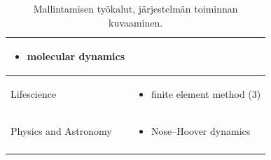\documentclass[utf8]{gradu3}
\begin{document}
\begin{longtable}[h]{|p{5cm}|p{8cm}|}
\begin{itemize}
        \item molecular dynamics
    \end{itemize} \\
    \hline
    Lifescience & \begin{itemize}
        \item finite element method (3)
    \end{itemize} \\
    \hline
    Physics and Astronomy & \begin{itemize}
        \item Nose–Hoover dynamics
    \end{itemize} \\
    \hline
    \caption{Mallintamisen työkalut, järjestelmän toiminnan kuvaaminen.}
    \label{table:mallintaminen 1.}
\end{longtable}

\pagebreak
\end{document}

